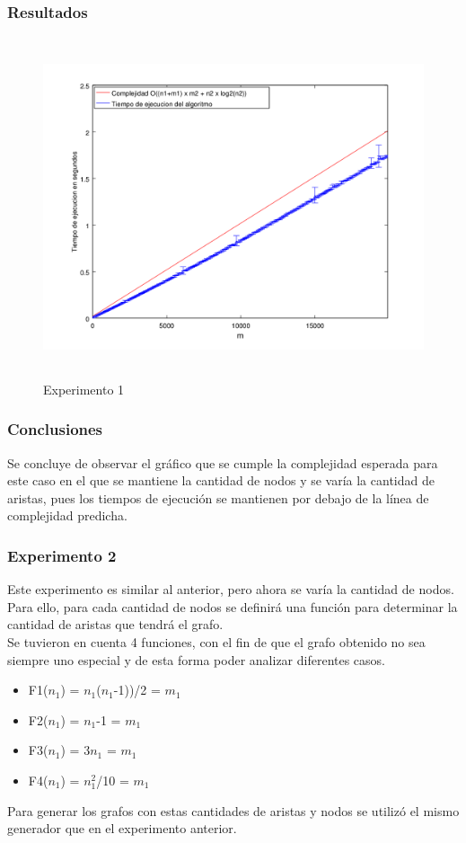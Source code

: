         \subsubsection*{Resultados}\;

    \begin{figure}[H]
      \includegraphics[height=10cm]{graficos/ejercicio4-exp1.png}
       \caption{Experimento 1}
	\end{figure}
        
\subsubsection*{Conclusiones}\;
Se concluye de observar el gráfico que se cumple la complejidad esperada para este caso en el que se mantiene la cantidad de nodos y se varía la cantidad de aristas, pues los tiempos de ejecución se mantienen por debajo de la línea de complejidad predicha.
    
    \subsubsection*{Experimento 2}\; 
    \noindent Este experimento es similar al anterior, pero ahora se varía la cantidad de nodos. Para ello, para cada cantidad de nodos se definirá una función para determinar la cantidad de aristas que tendrá el grafo. \\
    Se tuvieron en cuenta 4 funciones, con el fin de que el grafo obtenido no sea siempre uno especial y de esta forma poder analizar diferentes casos. 
        \begin{itemize}
        \item F1($n_1$) = $n_1$($n_1$-1))/2 = $m_1$ 
        \item F2($n_1$) = $n_1$-1 = $m_1$ 
        \item F3($n_1$) = 3$n_1$ = $m_1$
        \item F4($n_1$) = $n_1^{2}$/10 = $m_1$
		\end{itemize} 
 Para generar los grafos con estas cantidades de aristas y nodos se utilizó el mismo generador que en el experimento anterior.       
        
